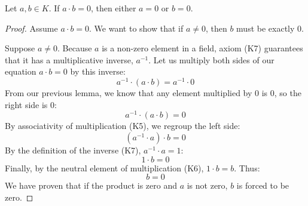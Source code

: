 \begin{lemma}
Let $a, b \in K$. If $a \cdot b = 0$, then either $a = 0$ or $b = 0$.
\end{lemma}

\begin{proof}
Assume $a \cdot b = 0$. We want to show that if $a \ne 0$, then $b$ must be exactly $0$.

Suppose $a \ne 0$. Because $a$ is a non-zero element in a field, axiom (K7) guarantees that it has a multiplicative inverse, $a^{-1}$. 
Let us multiply both sides of our equation $a \cdot b = 0$ by this inverse:
\[
a^{-1} \cdot (a \cdot b) = a^{-1} \cdot 0
\]
From our previous lemma, we know that any element multiplied by $0$ is $0$, so the right side is $0$:
\[
a^{-1} \cdot (a \cdot b) = 0
\]
By associativity of multiplication (K5), we regroup the left side:
\[
(a^{-1} \cdot a) \cdot b = 0
\]
By the definition of the inverse (K7), $a^{-1} \cdot a = 1$:
\[
1 \cdot b = 0
\]
Finally, by the neutral element of multiplication (K6), $1 \cdot b = b$. Thus:
\[
b = 0
\]
We have proven that if the product is zero and $a$ is not zero, $b$ is forced to be zero.
\end{proof}